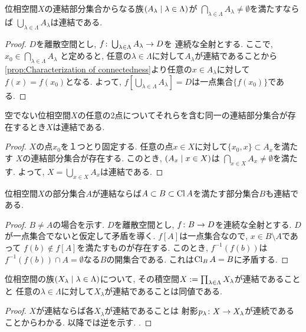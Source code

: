 \documentclass[uplatex, dvipdfmx, a4paper, 12pt, class=jsbook, crop=false]{standalone}
\begin{document}
\begin{proposition}
	\label{prop:Sum of every connected subsets in a family having intersection is connected}
	位相空間$ X $の連結部分集合からなる族$ \setfamily{A_\lambda}{\lambda \in \Lambda} $が
	$ \bigcap_{\lambda \in \Lambda} A_\lambda \neq \emptyset $を満たすならば
	$ \bigcup_{\lambda \in \Lambda} A_\lambda $は連結である.
\end{proposition}

\begin{proof}
	$ D $を離散空間とし, $ f\colon\bigcup_{\lambda \in \Lambda} A_\lambda\to D $を
	連続な全射とする. ここで, $ x_0 \in \bigcap_{\lambda \in \Lambda} A_\lambda $
	と定めると, 任意の$ \lambda \in \Lambda $に対して$ A_\lambda $が連結であることから
	\cref{prop:Characterization of connectedness}より任意の$ x \in A_\lambda $に対して
	$ f(x) = f(x_0) $となる.
	よって, $ f[\bigcup_{\lambda \in \Lambda} A_\lambda] = D $は一点集合$ \{f(x_0)\} $である.
\end{proof}

\begin{corollary}
	空でない位相空間$ X $の任意の2点についてそれらを含む同一の連結部分集合が存在するとき$ X $は連結である.
\end{corollary}

\begin{proof}
	$ X $の点$ x_0 $を１つとり固定する. 任意の点$ x \in X $に対して$ \{x_0, x\} \subset A_x $を満たす
	$ X $の連結部分集合が存在する. このとき, $ \setfamily{A_x}{x \in X} $は
	$ \bigcap_{x \in X} A_x \neq \emptyset$を満たす. よって, $ X = \bigcup_{x \in X} A_x $は連結である.
\end{proof}

\begin{proposition}
	\label{prop:Closure of a connected subspace is connected}
	位相空間$ X $の部分集合$ A $が連結ならば$ A \subset B \subset \mathop{\mathrm{Cl}}\nolimits A $を満たす部分集合$ B $も連結である.
\end{proposition}

\begin{proof}
	$ B \neq A $の場合を示す. $ D $を離散空間とし, $ f\colon B\to D $を連続な全射とする.
	$ D $が一点集合でないと仮定して矛盾を導く.
	$ f[A] $は一点集合なので, $ x \in B \setminus A $であって
	$ f(b) \notin f[A] $を満たすものが存在する.
	このとき, $ f^{-1}(f(b)) $は$ f^{-1}(f(b)) \cap A = \emptyset $なる$ B $の開集合である.
	これは$ \mathop{\mathrm{Cl}}\nolimits_B A = B $に矛盾する.
\end{proof}

\begin{proposition}
	\label{prop:A product space of connected spaces is connected}
	位相空間の族$ \setfamily{X_\lambda}{\lambda \in \Lambda} $について,
	その積空間$ X \mathrel{:=} \prod_{\lambda \in \Lambda} X_\lambda $が連結であることと
	任意の$ \lambda \in \Lambda $に対して$ X_\lambda $が連結であることは同値である.
\end{proposition}

\begin{proof}
	$ X $が連結ならば各$ X_\lambda $が連結であることは
	射影$ p_\lambda\colon X\to X_\lambda $が連続であることからわかる.
	以降では逆を示す.
	\WIP.
\end{proof}
\end{document}
